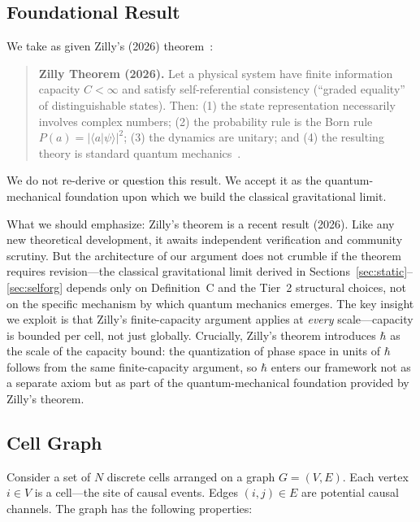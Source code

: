 \documentclass[aps,prd,twocolumn,showpacs,superscriptaddress,preprintnumbers]{revtex4-2}
\begin{document}
\subsection{Foundational Result}
\label{sec:foundational}

We take as given Zilly's (2026) theorem~\cite{Zilly:2026}:

\begin{quote}
\textbf{Zilly Theorem (2026).} Let a physical system have finite information capacity $C<\infty$ and satisfy self-referential consistency (``graded equality'' of distinguishable states). Then: (1) the state representation necessarily involves complex numbers; (2) the probability rule is the Born rule $P(a)=|\langle a|\psi\rangle|^2$; (3) the dynamics are unitary; and (4) the resulting theory is standard quantum mechanics~\cite{Zilly:2026}.
\end{quote}

We do not re-derive or question this result.
We accept it as the quantum-mechanical foundation upon which we build the classical gravitational limit.

What we should emphasize: Zilly's theorem is a recent result (2026).
Like any new theoretical development, it awaits independent verification and community scrutiny.
But the architecture of our argument does not crumble if the theorem requires revision---the classical gravitational limit derived in Sections~\ref{sec:static}--\ref{sec:selforg} depends only on Definition~C and the Tier~2 structural choices, not on the specific mechanism by which quantum mechanics emerges.
The key insight we exploit is that Zilly's finite-capacity argument applies at \emph{every} scale---capacity is bounded per cell, not just globally.
Crucially, Zilly's theorem introduces $\hbar$ as the scale of the capacity bound: the quantization of phase space in units of $\hbar$ follows from the same finite-capacity argument, so $\hbar$ enters our framework not as a separate axiom but as part of the quantum-mechanical foundation provided by Zilly's theorem.

\subsection{Cell Graph}

Consider a set of $N$ discrete cells arranged on a graph $G=(V,E)$.
Each vertex $i\in V$ is a cell---the site of causal events.
Edges $(i,j)\in E$ are potential causal channels.
The graph has the following properties:
\end{document}
